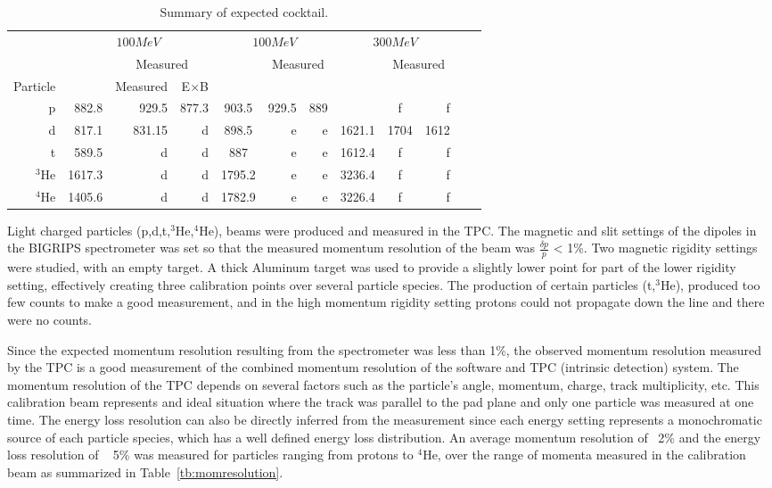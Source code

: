 \begin{table*}\centering
{}
\begin{tabular}{@{}rrrrcrrrcrrr@{}}\toprule
& \multicolumn{3}{c}{$100 MeV$} & \multicolumn{3}{c}{$100 MeV$} & \multicolumn{3}{c}{$300 MeV$}\\
\cmidrule{2-4} \cmidrule{6-8} \cmidrule{10-12}
& &\multicolumn{2}{c}{Measured} & & \multicolumn{2}{c}{Measured} & & \multicolumn{2}{c}{Measured}\\
\cmidrule{3-4} \cmidrule{7-8} \cmidrule{11-12}
Particle &\phantom{abc} & Measured & E$\times$B\\
\midrule
p   & 882.8 & 929.5 & 877.3 & 903.5 & 929.5 & 889 &\phantom{abcdef} & f & f \\
d   & 817.1 & 831.15 & d & 898.5 & e & e & 1621.1 & 1704 & 1612\\
t   & 589.5 & d & d & 887 & e & e & 1612.4 & f & f  \\
$^{3}$He  & 1617.3  & d & d & 1795.2 & e & e & 3236.4 & f & f\\
$^{4}$He  & 1405.6  & d & d & 1782.9 & e & e & 3226.4 & f & f \\
\bottomrule
\end{tabular}
\caption{Summary of expected cocktail. }
\label{tb:cocktailsummary}
\end{table*}

Light charged particles (p,d,t,${}^{3}$He,${}^{4}$He), beams were produced and measured in the TPC. The magnetic and slit settings of the dipoles in the BIGRIPS spectrometer was set so that the measured momentum resolution of the beam was $\frac{\delta p}{p}$ < 1\%. Two magnetic rigidity settings were studied, with an empty target. A thick Aluminum target was used to provide a slightly lower point for part of the lower rigidity setting, effectively creating three calibration points over several particle species. The production of certain particles (t,${}^{3}$He), produced too few counts to make a good measurement, and in the high momentum rigidity setting protons could not propagate down the line and there were no counts. 

Since the expected momentum resolution resulting from the spectrometer was less than 1\%, the observed momentum resolution measured by the TPC is a good measurement of the combined momentum resolution of the software and TPC (intrinsic detection) system. The momentum resolution of the TPC depends on several factors such as the particle's angle, momentum, charge, track multiplicity, etc. This calibration beam represents and ideal situation where the track was parallel to the pad plane and only one particle was measured at one time. The energy loss resolution can also be directly inferred from the measurement since each energy setting represents a monochromatic source of each particle species, which has a well defined energy loss distribution. An average momentum resolution of ~2\% and the energy loss resolution of ~ 5\% was measured for particles ranging from protons to ${}^{4}$He, over the range of momenta measured in the calibration beam as summarized in Table~\ref{tb:momresolution}.

